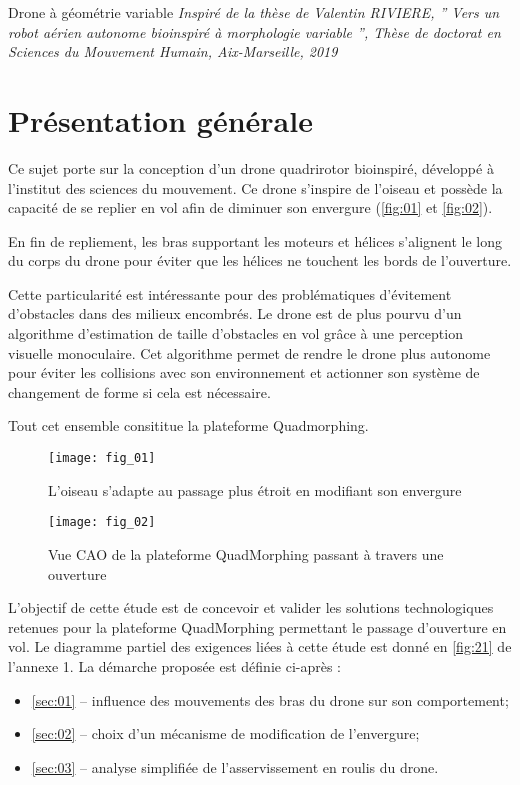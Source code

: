 
Drone à géométrie variable
\textit{Inspiré de la thèse de Valentin RIVIERE,
” Vers un robot aérien autonome bio­inspiré à morphologie variable ”,
Thèse de doctorat en Sciences du Mouvement Humain, Aix-­Marseille, 2019}

\section*{Présentation générale}


Ce sujet porte sur la conception d’un drone quadrirotor bio­inspiré, développé à l’institut des
sciences du mouvement. Ce drone s’inspire de l’oiseau et possède la capacité de se replier
en vol afin de diminuer son envergure (\autoref{fig:01} et \autoref{fig:02}).

En fin de repliement, les bras supportant les moteurs et hélices s’alignent le long du corps
du drone pour éviter que les hélices ne touchent les bords de l’ouverture.

Cette particularité est intéressante pour des problématiques d’évitement d’obstacles dans
des milieux encombrés. Le drone est de plus pourvu d’un algorithme d’estimation de taille
d’obstacles en vol grâce à une perception visuelle monoculaire. Cet algorithme permet de
rendre le drone plus autonome pour éviter les collisions avec son environnement et actionner
son système de changement de forme si cela est nécessaire.

Tout cet ensemble consititue la plateforme Quadmorphing.


\begin{minipage}[c]{.48\linewidth}
\begin{figure}[H]
\centering
\texttt{[image: fig\_01]}
\caption{\label{fig:01} L’oiseau s’adapte au passage
plus étroit en modifiant son envergure}
\end{figure}
\end{minipage}\hfill
\begin{minipage}[c]{.48\linewidth}
\begin{figure}[H]
\centering
\texttt{[image: fig\_02]}
\caption{\label{fig:02} Vue CAO de la plateforme QuadMorphing passant à travers une ouverture}
\end{figure}
\end{minipage}

\begin{obj}
L'objectif de cette étude est de concevoir et valider les solutions technologiques retenues
pour la plateforme QuadMorphing permettant le passage d’ouverture en vol. Le diagramme
partiel des exigences liées à cette étude est donné en \autoref{fig:21} de l’annexe 1.
La démarche proposée est définie ci­-après :
\begin{itemize}
\item ­\autoref{sec:01} --­ influence des mouvements des bras du drone sur son comportement;
\item ­\autoref{sec:02} --­ choix d’un mécanisme de modification de l’envergure;
\item ­\autoref{sec:03} --­ analyse simplifiée de l’asservissement en roulis du drone.
\end{itemize}
\end{obj}

